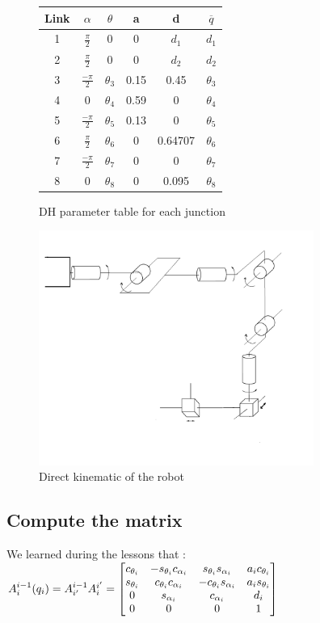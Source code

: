 \documentclass[english,a4paper,11pt]{report}
\begin{document}
	\begin{figure}
	\centering
		\begin{tabular}{c|c|c|c|c|c}
		Link & $\alpha$ & $\theta$ & a & d & $ \overline{q}$\\
		\hline
		1 & $\frac{\pi}{2}$ & 0 & 0 & $d_1$ &$ d_1$\\
		\hline
		2 & $\frac{\pi}{2}$ & 0 & 0 & $d_2$ & $d_2$\\
		\hline
		3 & $\frac{-\pi}{2}$ & $\theta_3$ & 0.15 & 0.45 & $\theta_3$\\
		\hline
		4 & 0 & $\theta_4$ & 0.59 & 0 & $\theta_4$\\
		\hline
		5 & $\frac{-\pi}{2}$ & $\theta_5$ & 0.13 & 0 & $\theta_5$ \\
		\hline
		6 & $\frac{\pi}{2}$ & $\theta_6$ & 0 & 0.64707 & $\theta_6$\\
		\hline
		7 & $\frac{-\pi}{2}$ & $\theta_7$ & 0 & 0 & $\theta_7$ \\
		\hline
		8 & 0 & $\theta_8$ & 0 & 0.095 & $\theta_8$\\
		\end{tabular}
		\caption{DH parameter table for each junction}
	\end{figure}
\begin{figure}[h]
	\center
		\includegraphics[width=9cm]{images_not_compressed/schema.png}

		\caption{Direct kinematic of the robot}
	\end{figure}
	
	
	\subsection{Compute the matrix}
	We learned during the lessons that :
	$A^{i-1}_{i}(q_{i}) = A^{i-1}_{i\rq{}}A^{i\rq{}}_{i} = 
	\begin{bmatrix} 
	c_{\theta_{i}} & - s_{\theta_{i}} c_{\alpha_{i}} & s_{\theta_{i}} s_{\alpha_{i}} & a_{i} c_{\theta_{i}}\\
	s_{\theta_{i}} &  c_{\theta_{i}} c_{\alpha_{i}} & -c_{\theta_{i}} s_{\alpha_{i}} & a_{i} s_{\theta_{i}}\\
	0 &  s_{\alpha_{i}}  & c_{\alpha_{i}} & d_{i}\\
	0 & 0 & 0 & 1
	\end{bmatrix} $
\end{document}
